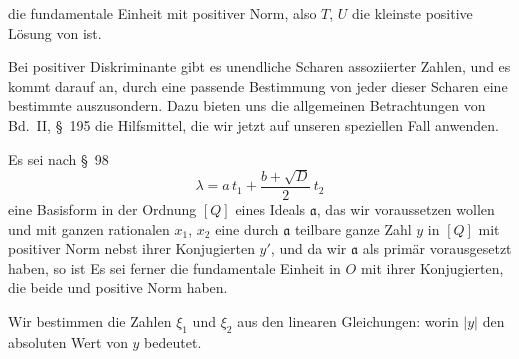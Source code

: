 
die fundamentale Einheit mit positiver Norm, also $T$, $U$ die
kleinste positive Lösung von
ist.

Bei positiver Diskriminante gibt es unendliche Scharen assoziierter
Zahlen, und es kommt darauf an, durch eine passende Bestimmung von
jeder dieser Scharen eine bestimmte auszusondern. Dazu bieten uns
die allgemeinen Betrachtungen von Bd.~II, \S\ 195 die Hilfsmittel,
die wir jetzt auf unseren speziellen Fall anwenden.

Es sei nach \S\ 98
\[
\lambda = a\, t_1 + \frac{b+\sqrt{D}}{2}\, t_2
\]
eine Basisform in der Ordnung $[Q]$ eines Ideals $\mathfrak{a}$, das wir
 voraussetzen wollen und
mit ganzen rationalen $x_1$, $x_2$ eine durch $\mathfrak{a}$ teilbare
ganze Zahl $y$ in $[Q]$ mit positiver Norm nebst ihrer Konjugierten
$y'$, und da wir $\mathfrak{a}$ als primär vorausgesetzt haben, so ist
Es sei ferner
die fundamentale Einheit in $O$ mit ihrer Konjugierten, die beide
 und positive Norm haben.

Wir bestimmen die Zahlen $\xi_1$ und $\xi_2$ aus den linearen
Gleichungen:
worin $|y|$ den absoluten Wert von $y$ bedeutet.
